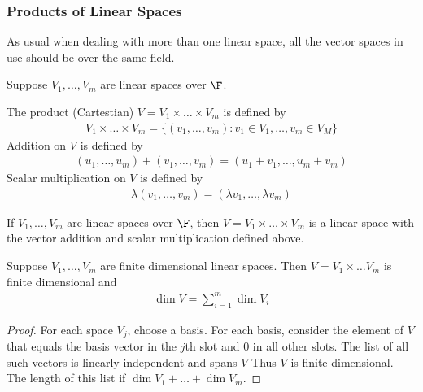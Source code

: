 \documentclass{article}
\begin{document}
\subsubsection{Products of Linear Spaces}
  As usual when dealing with more than one linear space, all the vector spaces in use should be over the same field.
  \begin{defn}
    Suppose $V_1, \dots, V_m$ are linear spaces over $\F$.
    \begin{itemize}
      \ii The product (Cartestian) $V = V_1 \times \dots \times V_m$ is defined by 
        \begin{align*}
          V_1 \times \dots \times V_m = \{(v_1, \dots, v_m): v_1 \in V_1, \dots, v_m \in V_M\}
        \end{align*}
      \ii Addition on $V$ is defined by 
      \begin{align*}
        (u_1, \dots, u_m) + (v_1, \dots, v_m) = (u_1 + v_1, \dots, u_m + v_m)
      \end{align*}
      \ii Scalar multiplication on $V$ is defined by 
      \begin{align*}
        \lambda(v_1, \dots, v_m) = (\lambda v_1, \dots, \lambda v_m)
      \end{align*}
    \end{itemize}
  \end{defn}
  \begin{prop}
    If $V_1, \dots, V_m$ are linear spaces over $\F$, then $V = V_1 \times \dots \times V_m$ is a linear space with the vector addition and scalar multiplication defined above.
  \end{prop}
  \begin{prop}
    Suppose $V_1, \dots, V_m$ are finite dimensional linear spaces. Then $V = V_1 \times \dots V_m$ is finite dimensional and
    \begin{align*}
      \dim V = \sum_{i = 1}^{m}\dim V_i
    \end{align*}
  \end{prop}
  \begin{proof}
    For each space $V_j$, choose a basis. For each basis, consider the element of $V$ that equals the basis vector in the $j$th slot and $0$ in all other slots. The list of all such vectors
    is linearly independent and spans $V$ Thus $V$ is finite dimensional. The length of this list if $\dim V_1 + \dots + \dim V_m$.
  \end{proof}
\end{document}
